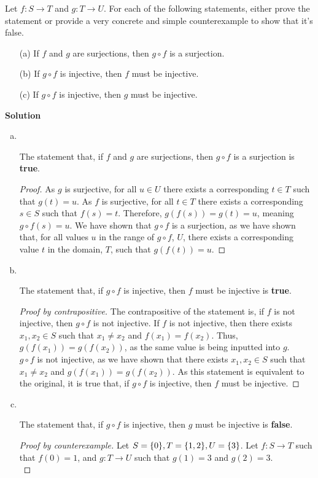 \documentclass[11pt]{scrartcl}
\theoremstyle{dotlessP}
\theoremstyle{dotlessN}
\newcommand{\comp}{\circ} %
\DeclarePairedDelimiter\set{\{}{\}}
\begin{document}
\begin{ques}
	 Let $f: S \to T$ and $g: T \to U$. For each of the following statements, either prove the statement or provide a very concrete and simple counterexample to show that it's false. 
    \begin{itemize}
        \item[(a)] If $f$ and $g$ are surjections, then $g \circ f$ is a surjection.
        \item[(b)] If $g \circ f$ is injective, then $f$ must be injective.
        \item[(c)] If $g \circ f$ is injective, then $g$ must be injective.
    \end{itemize}
\end{ques}
\textbf{Solution}
\begin{enumerate}[(a)]
	\item \
		\begin{claim*}
			The statement that, if $f$ and $g$ are surjections, then $g \comp f$ is a surjection is \textbf{true}.
		\end{claim*}
	\begin{proof}
		 As  $g$ is surjective, for all $u \in U$ there exists a corresponding $t \in T$ such that  $g(t) = u$. As $f$ is surjective, for all $t \in T$ there exists a corresponding $s \in S$ such that $f(s) = t$. Therefore,  $g(f(s)) = g(t) = u$, meaning $g \comp f (s) = u$. We have shown that $g \comp f$ is a surjection, as we have shown that, for all values $u$ in the range of $g \comp f$, $U$, there exists a corresponding value $t$ in the domain, $T$, such that $g(f(t)) = u$.
	\end{proof}
\item \
	\begin{claim*}
		The statement that, if $g \comp f$ is injective, then $f$ must be injective is \textbf{true}.
	\end{claim*}
	\begin{proof}
		[Proof by contrapositive] The contrapositive of the statement is, if $f$ is not injective, then $g \comp f$ is not injective. If $f$ is not injective, then there exists $x_1, x_2 \in S$ such that $x_1 \neq x_2$ and $f(x_1) = f(x_2)$. Thus,  $g(f(x_1)) = g(f(x_2))$, as the same value is being inputted into $g$. 
		\\

		$g \comp f$ is not injective, as we have shown that there exists $x_1, x_2 \in S$ such that $x_1 \neq x_2$ and $g(f(x_1)) = g(f(x_2))$. As this statement is equivalent to the original, it is true that, if $g \comp f$ is injective, then $f$ must be injective.
	\end{proof}
\item \
	\begin{claim*}
		The statement that, if $g \comp f$ is injective, then $g$ must be injective is \textbf{false}.
	\end{claim*}
	\begin{proof}
		[Proof by counterexample]
		Let $S = \set*{0}, T = \set*{1,2}, U = \set*{3}$. Let $f: S\to T$ such that $f(0) = 1$, and  $g: T \to U$ such that $g(1) = 3$ and  $g(2) = 3$.
		\\


\end{proof}
\end{enumerate}
\end{document}
